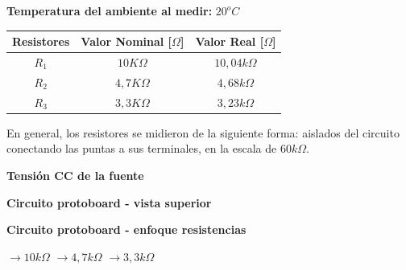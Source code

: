 \begin{center}\textbf{Temperatura del ambiente al medir:} $20^oC$\end{center}
\saltoPag{}

        \begin{center} 
            \begin{tabular}{| p{1cm}  p{1cm}  p{1cm} |} 
                \hline 
                \multicolumn{1}{|m{1.4cm}}{\centering\textbf{Resistores}} &
                \multicolumn{1}{m{1.4cm}}{\centering\textbf{Valor Nominal [$\Omega$]}} &
                \multicolumn{1}{m{1.4cm}|}{\centering\textbf{Valor Real [$\Omega$]}} \\
                \hline
                \multicolumn{1}{|c}{$R_1$} &
                \multicolumn{1}{c}{$10K\Omega$} &
                \multicolumn{1}{c|}{$10,04k\Omega$} \\
                \multicolumn{1}{|c}{$R_2$} &
                \multicolumn{1}{c}{$4,7K\Omega$} &
                \multicolumn{1}{c|}{$4,68k\Omega$} \\
                \multicolumn{1}{|c}{$R_3$} &
                \multicolumn{1}{c}{$3,3K\Omega$} &
                \multicolumn{1}{c|}{$3,23k\Omega$} \\
                \hline
            \end{tabular}
        \end{center}
        \sangria{} En general, los resistores se midieron de la siguiente forma: aislados del circuito conectando las puntas a sus terminales, en la escala de $60k\Omega$.
        \begin{center}\textbf{Tensión CC de la fuente} \end{center}
        \begin{center} \textbf{Circuito protoboard - vista superior} \end{center}
        \begin{center} \textbf{Circuito protoboard - enfoque resistencias} \end{center}
         $\rightarrow 10k\Omega$
         $\rightarrow 4,7k\Omega$
         $\rightarrow 3,3k\Omega$

